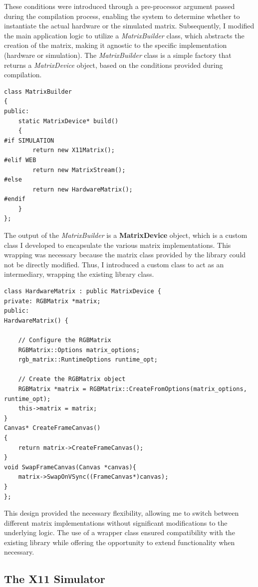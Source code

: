 These conditions were introduced through a pre-processor argument passed during the compilation process, enabling the system to determine whether to instantiate the actual hardware or the simulated matrix. Subsequently, I modified the main application logic to utilize a \textit{MatrixBuilder} class, which abstracts the creation of the matrix, making it agnostic to the specific implementation (hardware or simulation). The \textit{MatrixBuilder} class is a simple factory that returns a \textit{MatrixDevice} object, based on the conditions provided during compilation.

\begin{verbatim}
class MatrixBuilder
{
public:
    static MatrixDevice* build()
    {
#if SIMULATION
        return new X11Matrix();
#elif WEB
        return new MatrixStream();
#else
        return new HardwareMatrix();
#endif
    }
};
\end{verbatim}

The output of the \textit{MatrixBuilder} is a \textbf{MatrixDevice} object, which is a custom class I developed to encapsulate the various matrix implementations. This wrapping was necessary because the matrix class provided by the library could not be directly modified. Thus, I introduced a custom class to act as an intermediary, wrapping the existing library class.

\begin{verbatim}
class HardwareMatrix : public MatrixDevice {
private: RGBMatrix *matrix;
public: 
HardwareMatrix() {

    // Configure the RGBMatrix
    RGBMatrix::Options matrix_options;
    rgb_matrix::RuntimeOptions runtime_opt;

    // Create the RGBMatrix object
    RGBMatrix *matrix = RGBMatrix::CreateFromOptions(matrix_options, runtime_opt);
    this->matrix = matrix;
}
Canvas* CreateFrameCanvas()
{
    return matrix->CreateFrameCanvas();
}
void SwapFrameCanvas(Canvas *canvas){
    matrix->SwapOnVSync((FrameCanvas*)canvas);
}
}; \end{verbatim}

This design provided the necessary flexibility, allowing me to switch between different matrix implementations without significant modifications to the underlying logic. The use of a wrapper class ensured compatibility with the existing library while offering the opportunity to extend functionality when necessary.

\subsection{The X11 Simulator}

